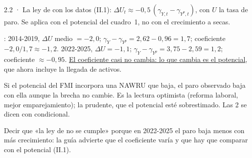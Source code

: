 \begin{complemento}{2.2 · La ley de  con los datos}
 (II.1): $\Delta U_t\approx-0{,}5\,(\gamma_{Y,t}-\gamma_{Y^p,t})$, con $U$ la tasa de paro. Se aplica con el potencial del cuadro~1, no con el crecimiento a secas.


: 2014-2019, $\Delta U$ medio $=-2{,}0$; $\gamma_Y-\gamma_{Y^p}=2{,}62-0{,}96=1{,}7$; coeficiente $-2{,}0/1{,}7\approx-1{,}2$. 2022-2025, $\Delta U=-1{,}1$; $\gamma_Y-\gamma_{Y^p}=3{,}75-2{,}59=1{,}2$; coeficiente $\approx-0{,}95$. \uline{El coeficiente casi no cambia: lo que cambia es el potencial}, que ahora incluye la llegada de activos.

 Si el potencial del FMI incorpora una NAWRU que baja, el paro observado baja con ella aunque la brecha no cambie. Es la lectura optimista (reforma laboral, mejor emparejamiento); la prudente, que el potencial esté sobrestimado. Las 2 se dicen con condicional.

 Decir que «la ley de  no se cumple» porque en 2022-2025 el paro baja menos con más crecimiento: la guía advierte que el coeficiente varía y que hay que comparar con el potencial (II.1).

\begin{figuracaja}
\caption{España: variación del paro y crecimiento por encima del potencial, 2008-2025}\label{fig:s03}
\end{figuracaja}
\end{complemento}

